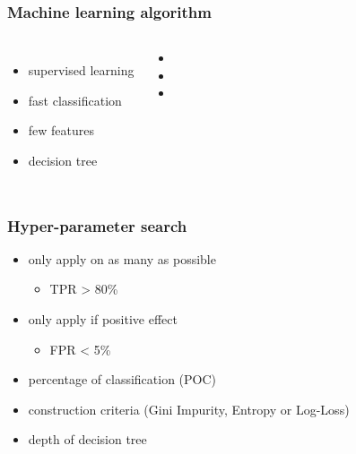 \begin{frame}
	\frametitle{Machine learning algorithm}
	
	\begin{columns}[c]
		
		
		\begin{itemize}
			\item supervised learning
			\item fast classification
			\item few features
			\item decision tree
		\end{itemize}
		
		
		\begin{itemize}
			\item 
			\item 
			\item 
		\end{itemize}	
		
	\end{columns}
	
\end{frame}

\begin{frame}
	\frametitle{Hyper-parameter search}
	
	\begin{itemize}
		\item only apply on as many as possible
			\begin{itemize}
				\item TPR > 80\%
			\end{itemize}
		\item only apply if positive effect
			\begin{itemize}
				\item FPR < 5\%
			\end{itemize}
		\item percentage of classification (POC)
		\item construction criteria (Gini Impurity, Entropy or Log-Loss)
		\item depth of decision tree
	\end{itemize}
	
\end{frame}

